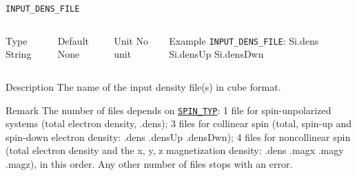 \begin{frame}[allowframebreaks]{\texttt{INPUT\_DENS\_FILE}} \label{INPUT_DENS_FILE}
\vspace*{-12pt}
\begin{columns}
\begin{block}{Type}
String
\end{block}

\begin{block}{Default}
None
\end{block}

\begin{block}{Unit}
No unit
\end{block}

\begin{block}{Example}
\texttt{INPUT\_DENS\_FILE}: Si.dens Si.densUp Si.densDwn
\end{block}
\end{columns}

\begin{block}{Description}
The name of the input density file(s) in cube format. 
\end{block}

\begin{block}{Remark}
The number of files depends on \hyperlink{SPIN_TYP}{\texttt{SPIN\_TYP}}: 1 file for spin-unpolarized systems (total electron density, .dens); 3 files for collinear spin (total, spin-up and spin-down electron density: .dens .densUp .densDwn); 4 files for noncollinear spin (total electron density and the x, y, z magnetization density: .dens .magx .magy .magz), in this order. Any other number of files stops with an error.
\end{block}

\end{frame}
